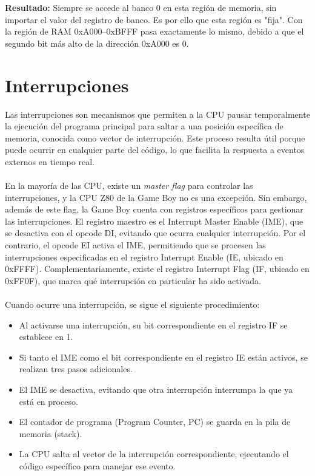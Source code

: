\textbf{Resultado:} Siempre se accede al banco 0 en esta región de memoria, sin importar el valor del registro de banco. Es por ello que esta región es "fija". Con la región de RAM 0xA000–0xBFFF pasa exactamente lo mismo, debido a que el segundo bit más alto de la dirección 0xA000 es 0.

\section{Interrupciones}

Las interrupciones son mecanismos que permiten a la CPU pausar temporalmente la ejecución del programa principal para saltar a una posición específica de memoria, conocida como vector de interrupción. Este proceso resulta útil porque puede ocurrir en cualquier parte del código, lo que facilita la respuesta a eventos externos en tiempo real.
\\\\
En la mayoría de las CPU, existe un \textit{master flag} para controlar las interrupciones, y la CPU Z80 de la Game Boy no es una excepción. Sin embargo, además de este flag, la Game Boy cuenta con registros específicos para gestionar las interrupciones. El registro maestro es el Interrupt Master Enable (IME), que se desactiva con el opcode DI, evitando que ocurra cualquier interrupción. Por el contrario, el opcode EI activa el IME, permitiendo que se procesen las interrupciones especificadas en el registro Interrupt Enable (IE, ubicado en 0xFFFF). Complementariamente, existe el registro Interrupt Flag (IF, ubicado en 0xFF0F), que marca qué interrupción en particular ha sido activada.
\\\\
Cuando ocurre una interrupción, se sigue el siguiente procedimiento:

\begin{itemize}
    \item Al activarse una interrupción, su bit correspondiente en el registro IF se establece en 1.
    \item Si tanto el IME como el bit correspondiente en el registro IE están activos, se realizan tres pasos adicionales.
    \item El IME se desactiva, evitando que otra interrupción interrumpa la que ya está en proceso.
    \item El contador de programa (Program Counter, PC) se guarda en la pila de memoria (stack).
    \item La CPU salta al vector de la interrupción correspondiente, ejecutando el código específico para manejar ese evento.
\end{itemize}
    
